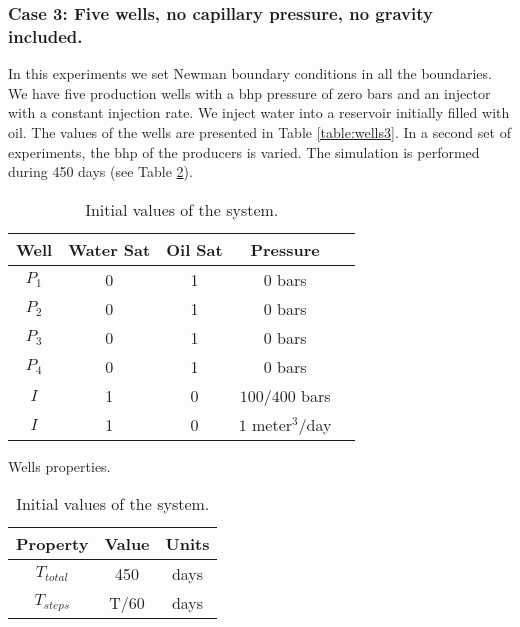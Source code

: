 \documentclass[12pt]{article}
\begin{document}
\subsubsection*{Case 3: Five wells, no capillary pressure, no gravity included.}
In this experiments we set Newman boundary conditions in all the boundaries. We have five production wells with a bhp pressure of zero bars and an injector with a constant injection rate. We inject water into a reservoir initially filled with oil. The values of the wells are presented in Table \ref{table:wells3}. In a second set of experiments, the bhp of the producers is varied. The simulation is performed during 450 days (see Table \ref{table:icw}).  
\begin{table}[!ht]
\hspace{-0cm}
\begin{minipage}{.5\textwidth}
\centering
\begin{tabular}{ |c|c|c|c|c|} 
\hline
Well&Water Sat&Oil Sat&Pressure\\
\hline
$P_1$&     0&    1 & $0$ bars \\  
$P_2$& 0& 1& $0$ bars\\
$P_3$&     0&    1 & $0$ bars \\  
$P_4$& 0& 1& $0$ bars\\
$I$&     1&    0 & $100/400$ bars\\  
$I$&     1&    0 & $1$ meter$^3$/day\\  
\hline
\end{tabular}
\caption{Wells properties.}\label{table:wells3}
\end{minipage}%
\begin{minipage}{.4\textwidth}
\centering
\begin{tabular}{ |c|c|c|} 
\hline
Property&Value&Units\\
\hline
    $T_{total}$&     450& days\\
$T_{steps}$& T/60&days\\
\hline
\end{tabular}\caption{Initial values of the system.}
\label{table:icw}
\end{minipage}
\hspace{1cm} 
\end{table} 
\end{document}
